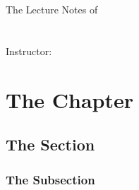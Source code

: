 \documentclass[10pt,letterpaper]{report}
\begin{document}
\begin{titlepage}
\begin{center}
  \textsc{\Large \theUniversity}\\[0.5cm]
  \textsc{\theDepartment}\\[6.0cm]
  \Large The Lecture Notes of\\
  \huge \theCourseNumber\;\;\textbf{\theCourseTitle}\\[0.5cm]
  \Large \theDate\\[10.0cm] %
  Instructor: \theInstructor
\end{center}
\end{titlepage}
\tableofcontents
\chapter{The Chapter}
\section{The Section}
\subsection{The Subsection}
\end{document}
